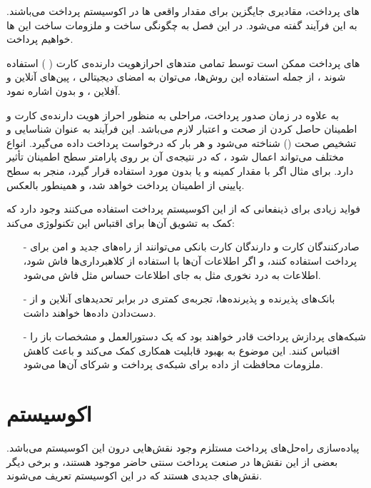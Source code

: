 \documentclass[oneside]{report}
\begin{document}
{\normalsize  {}} های 
پرداخت،  مقادیری جایگزین برای مقدار واقعی 
{\normalsize  {}}ها 
در اکوسیستم پرداخت می‌باشند. به این فرآیند 
{\normalsize {}}
 گفته می‌شود. در این فصل به چگونگی ساخت و ملزومات ساخت این 
{\normalsize  {}}ها
خواهیم پرداخت. 

{\normalsize  {}}های پرداخت
ممکن است توسط تمامی متدهای احرازهویت دارنده‌ی کارت 
(
{\normalsize  {}}
)
استفاده شوند ، از جمله استفاده این روش‌ها، می‌توان به امضای دیجیتالی ، پین‌های آنلاین و آفلاین ، و بدون
{\normalsize  {}}
اشاره نمود.
														
 به علاوه در زمان صدور 
 {\normalsize  {}}
 پرداخت، مراحلی به منظور احراز هویت دارنده‌ی کارت و اطمینان حاصل کردن از صحت و اعتبار 
 {\normalsize  {}}
 لازم می‌باشد.
 این فرآیند به عنوان  شناسایی و تشخیص صحت 
({\normalsize  {}})
شناخته می‌شود و هر بار که درخواست 
{\normalsize  {}}
پرداخت داده می‌گیرد. انواع مختلف 
{\normalsize  {}}
می‌تواند اعمال شود ، که در نتیجه‌ی آن بر روی پارامتر سطح اطمینان 
{\normalsize  {}}
تأثیر دارد. برای مثال اگر با مقدار کمینه و یا بدون 
{\normalsize  {}}
مورد استفاده قرار گیرد، منجر به سطح پایینی از اطمینان 
{\normalsize  {}}
پرداخت خواهد شد،  و همینطور بالعکس. 

فواید زیادی برای ذینفعانی که از این اکوسیستم پرداخت استفاده می‌کنند وجود دارد که کمک به تشویق آن‌ها برای اقتباس این تکنولوژی می‌کند:
\begin{itemize}
	\item[-] 
	صادرکنندگان کارت و دارندگان کارت بانکی می‌توانند از راه‌های جدید و امن برای پرداخت استفاده کنند، و اگر اطلاعات آن‌ها با استفاده از کلاهبرداری‌ها فاش شود، اطلاعات به درد نخوری مثل 
	{\normalsize  {}}
	به جای اطلاعات حساس مثل 
	{\normalsize  {}}
	فاش می‌شود. 
	\item[-]
	بانک‌های پذیرنده و پذیرنده‌ها، تجربه‌ی کمتری در برابر تحدیدهای آنلاین و از دست‌دادن داده‌ها خواهند داشت.
	\item[-] 
	شبکه‌های پردازش پرداخت قادر خواهند بود که یک دستورالعمل و مشخصات باز را اقتباس کنند. این موضوع به  بهبود قابلیت همکاری کمک می‌کند و باعث کاهش ملزومات محافظت از داده برای شبکه‌ی پرداخت و شرکای آن‌ها می‌شود. 
\end{itemize}

\section{اکوسیستم {\large  {}}}					
پیاده‌سازی راه‌حل‌های 
{\large  {}}
پرداخت مستلزم وجود نقش‌هایی درون این اکوسیستم می‌باشد. بعضی از این نقش‌ها در صنعت پرداخت سنتی حاضر موجود هستند، و برخی دیگر نقش‌های جدیدی هستند که در این اکوسیستم تعریف می‌شوند. 
\end{document}
